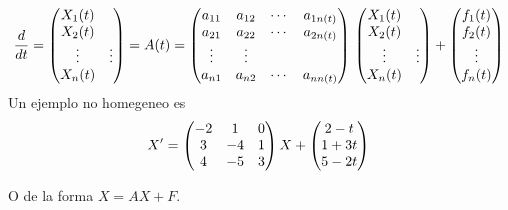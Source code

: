 \documentclass[11.5pt]{article}
\begin{document}
\begin{equation}
\left.
\frac{d}{dt}=\begin{pmatrix}
 X_1(t)\\
 X_2(t)\\
 \vdots&\vdots\\
 X_n(t)\\
\end{pmatrix}
=
A(t)=\begin{pmatrix}
 a_{11} & a_{12}& \cdots& a_{1n(t)}\\ 
 a_{21} & a_{22}& \cdots& a_{2n(t)}\\  
 \vdots&\vdots\\
 a_{n1} & a_{n2}& \cdots& a_{nn(t)}\\ 
 
\end{pmatrix}\\
\begin{pmatrix}
 X_1(t)\\
 X_2(t)\\
 \vdots&\vdots\\
 X_n(t)\\
\end{pmatrix}
+
\begin{pmatrix}
 f_1(t)\\
 f_2(t)\\
 \vdots\\
  f_n(t)\\
\end{pmatrix}\\
\right.
\end{equation}
Un ejemplo no homegeneo es \\
\begin{equation}
\left.
X'=\begin{pmatrix}
-2&1&0\\
 3&-4&1\\
 4&-5&3\\
\end{pmatrix}
X +
\begin{pmatrix}
2-t\\ 
1+3t\\  
5-2t\\ 
 
\end{pmatrix}\\
\right.
\end{equation}

O de la forma \textbf{$X =AX + F.$}
\end{document}
